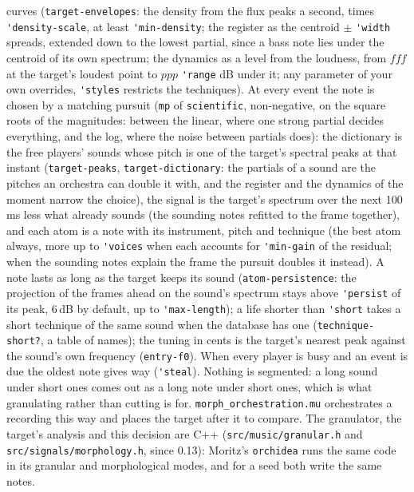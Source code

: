 \documentclass[11pt,a4paper]{article}
\newcommand{\musil}[1]{\lstinline[style=musilinline]{#1}}
\begin{document}
curves (\musil{target-envelopes}: the density from the flux peaks a second, times
\musil{'density-scale}, at least \musil{'min-density}; the register as the centroid $\pm$ \musil{'width} spreads, extended down
to the lowest partial, since a bass note lies under the centroid of its own spectrum; the
dynamics as a level from the loudness, from $fff$ at the target's loudest point to $ppp$
\musil{'range} dB under it; any parameter of your own overrides, \musil{'styles} restricts
the techniques). At every event the note is chosen by a matching pursuit (\musil{mp} of
\texttt{scientific}, non-negative, on the square roots of the magnitudes: between the
linear, where one strong partial decides everything, and the log, where the noise between
partials does): the dictionary is the free players' sounds whose pitch is one of the
target's spectral peaks at that instant (\musil{target-peaks}, \musil{target-dictionary}:
the partials of a sound are the pitches an orchestra can double it with, and the register
and the dynamics of the moment narrow the choice), the signal is the target's spectrum
over the next 100\,ms less what already sounds (the sounding
notes refitted to the frame together), and each atom is a note with its instrument, pitch
and technique (the best atom always, more up to \musil{'voices} when
each accounts for \musil{'min-gain} of the residual; when the sounding notes explain the
frame the pursuit doubles it instead). A note lasts as long as the target keeps its sound
(\musil{atom-persistence}: the projection of the frames ahead on the sound's spectrum stays
above \musil{'persist} of its peak, 6\,dB by default, up to \musil{'max-length}); a life
shorter than \musil{'short} takes a short technique of the same sound when the database
has one (\musil{technique-short?}, a table of names); the tuning in cents is the target's
nearest peak against the sound's own frequency (\musil{entry-f0}). When every player is
busy and an event is due the oldest note gives way (\musil{'steal}). Nothing is segmented:
a long sound under short ones comes out as a long note under short ones, which is what
granulating rather than cutting is for. \texttt{morph\_orchestration.mu} orchestrates a
recording this way and places the target after it to compare. The granulator, the target's
analysis and this decision are C++ (\texttt{src/music/granular.h} and
\texttt{src/signals/morphology.h}, since 0.13): Moritz's \texttt{orchidea} runs the same code in
its granular and morphological modes, and for a seed both write the same notes.
\end{document}
